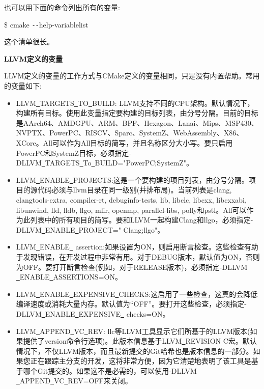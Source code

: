 也可以用下面的命令列出所有的变量:\par

\begin{tcolorbox}[colback=white,colframe=black]
	\$ cmake \verb|--|help-variablelist
\end{tcolorbox}

这个清单很长。\par


\hspace*{\fill} \par %
\textbf{LLVM定义的变量}

LLVM定义的变量的工作方式与CMake定义的变量相同，只是没有内置帮助。常用的变量如下:\par

\begin{itemize}
	\item LLVM\underline{~}TARGETS\underline{~}TO\underline{~}BUILD: LLVM支持不同的CPU架构。默认情况下，构建所有目标。使用此变量指定要构建的目标列表，由分号分隔。目前的目标是AArch64、AMDGPU、ARM、BPF、Hexagon、Lanai、Mips、MSP430、NVPTX、PowerPC、RISCV、Sparc、SystemZ、WebAssembly、X86、XCore。All可以作为All目标的简写，并且名称区分大小写。要只启用PowerPC和SystemZ目标，必须指定-DLLVM\underline{~}TARGETS\underline{~}To\underline{~}BUILD="PowerPC;SystemZ"。
	
	\item LLVM\underline{~}ENABLE\underline{~}PROJECTS:这是一个要构建的项目列表，由分号分隔。项目的源代码必须与llvm目录在同一级别(并排布局)。当前列表是clang, clangtools-extra, compiler-rt, debuginfo-tests, lib, libclc, libcxx, libcxxabi, libunwind, lld, lldb, llgo, mlir, openmp, parallel-libs, polly和pstl。All可以作为此列表中的所有项目的简写。要和LLVM一起构建Clang和llgo，必须指定-DLLVM\underline{~}ENABLE\underline{~}PROJECT=" Clang;llgo"。
	
	\item LLVM\underline{~}ENABLE\underline{~} assertion:如果设置为ON，则启用断言检查。这些检查有助于发现错误，在开发过程中非常有用。对于DEBUG版本，默认值为ON，否则为OFF。要打开断言检查(例如，对于RELEASE版本)，必须指定-DLLVM \underline{~}ENABLE\underline{~}ASSERTIONS=ON。
	
	\item LLVM\underline{~}ENABLE\underline{~}EXPENSIVE\underline{~}CHECKS:这启用了一些检查，这真的会降低编译速度或消耗大量内存。默认值为“OFF”。要打开这些检查，必须指定-DLLVM\underline{~}ENABLE\underline{~}EXPENSIVE\underline{~} checks=ON。
	
	\item LLVM\underline{~}APPEND\underline{~}VC\underline{~}REV: llc等LLVM工具显示它们所基于的LLVM版本(如果提供了version命令行选项)。此版本信息基于LLVM\underline{~}REVISION C宏。默认情况下，不仅LLVM版本，而且最新提交的Git哈希也是版本信息的一部分。如果您正在跟踪主分支的开发，这将非常方便，因为它清楚地表明了该工具是基于哪个Git提交的。如果这不是必需的，可以使用-DLLVM \underline{~}APPEND\underline{~}VC\underline{~}REV=OFF来关闭。
	

\end{itemize}

